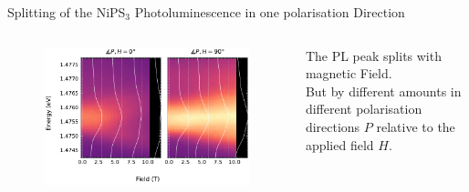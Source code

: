 \documentclass[
	10pt,
]{beamer}
\begin{document}
\begin{frame}{Splitting of the NiPS$_3$ Photoluminescence in one polarisation Direction}
	\begin{columns}
		\begin{figure}
			\centering
			\includegraphics[width=\textwidth]{../figures/2024-04-07 NiPS3 Splitting.pdf}
		\end{figure}

		The PL peak splits with magnetic Field.
		\vspace{.5cm}\\
		But by different amounts in different polarisation directions $P$ relative to the applied field $H$.
	\end{columns}
\end{frame}
\end{document}
